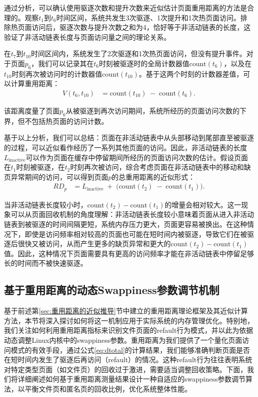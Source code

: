 通过分析，可以确认使用驱逐次数和提升次数来近似估计页面重用距离的方法是合理的。观察$t_1$到$t_6$时间区间，系统共发生3次驱逐、1次提升和1次热页面访问。排除热页面访问后，驱逐次数与提升次数之和为4，恰好等于非活动链表的长度，这验证了非活动链表长度与页面访问量之间的理论关系。

在$t_7$到$t_{10}$时间区间内，系统发生了2次驱逐和1次热页面访问，但没有提升事件。对于页面$p_6$，我们可以记录其在$t_6$时刻被驱逐时的全局计数器值$\mathrm{count}(t_6)$，以及在$t_{10}$时刻再次被访问时的计数器值$\mathrm{count}(t_{10})$。基于这两个时刻的计数器差值，可以计算重用距离：
\begin{align}
  \label{eq:refault_distance}
  V(t_6, t_{10})
  &= 
  \mathrm{count}(t_{10})
  \;-\;
  \mathrm{count}(t_6).
\end{align}

该距离度量了页面$p_6$从被驱逐到再次访问期间，系统所经历的页面访问次数的下界，但不包括热页面的访问计数。

基于以上分析，我们可以总结：页面在非活动链表中从头部移动到尾部直至被驱逐的过程，可以近似看作经历了一系列其他页面的访问。因此，非活动链表的长度$L_{\mathrm{inactive}}$可以作为页面在缓存中停留期间所经历的页面访问次数的估计。假设页面在$t_1$时刻被驱逐，在$t_2$时刻再次被访问，综合考虑页面在非活动链表中的移动和缺页异常期间的访问，可以得到页面$p$的总重用距离的近似形式：
\begin{align}
  \label{eq:dtotal}
  RD_p
  &= 
  L_{\mathrm{inactive}}
  \;+\;
  \bigl(\mathrm{count}(t_2) \;-\; \mathrm{count}(t_1)\bigr).
\end{align}

当非活动链表长度较小时，$\mathrm{count}(t_2) - \mathrm{count}(t_1)$的增量会相对较大。这一现象可以从页面回收机制的角度理解：非活动链表长度较小意味着页面从进入非活动链表到被驱逐的时间间隔更短，系统内存压力更大，页面更容易被换出。在这种情况下，即使是访问频率相对较高的页面也可能在短时间内被驱逐，导致它们在被驱逐后很快又被访问，从而产生更多的缺页异常和更大的$\mathrm{count}(t_2) - \mathrm{count}(t_1)$值。因此，这种情况下页面需要具有更高的访问频率才能在非活动链表中停留足够长的时间而不被快速驱逐。


\subsection{基于重用距离的动态Swappiness参数调节机制}

基于前述第\ref{sec:重用距离的近似推导}节中建立的重用距离理论框架及其近似计算方法，本节将深入探讨如何将这一机制应用于实际系统的内存管理优化。特别地，我们关注如何利用重用距离指标来识别文件页面的refault行为模式，并以此为依据动态调整Linux内核中的swappiness参数。重用距离为我们提供了一个量化页面访问模式的有效手段，通过公式\ref{eq:dtotal}的计算结果，我们能够准确判断页面是否在短时间内发生了驱逐后再访问（refault）的情况。这种refault行为往往表明系统对特定类型页面（如文件页）的回收过于激进，需要适当调整回收策略。下面，我们将详细阐述如何基于重用距离测量结果设计一种自适应的swappiness参数调节算法，以平衡文件页和匿名页的回收比例，优化系统整体性能。

